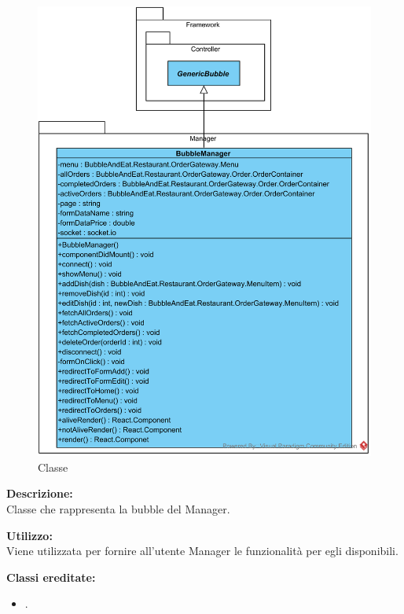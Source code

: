 \paragraph[::Restaurant::Manager::BubbleManager]{\class}\mbox{}\\ \label{\class}
\begin{figure}[H]
	\centering
	\includegraphics[width=14cm]{./diagrammi/demo/client/manager.png}
	\caption{Classe \class}
\end{figure}
\textbf{Descrizione:}\\
Classe che rappresenta la bubble del Manager.

\textbf{Utilizzo:}\\
Viene utilizzata per fornire all'utente Manager le funzionalità per egli disponibili.

\textbf{Classi ereditate:}
\begin{itemize}
	\item {}.
\end{itemize}
%

